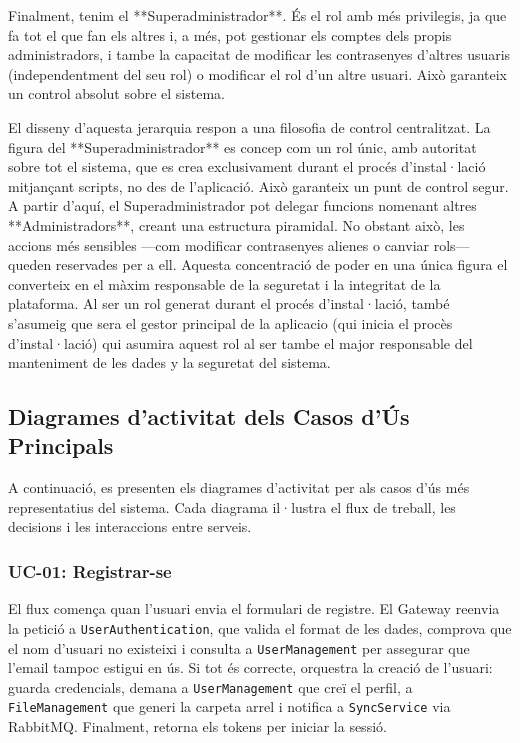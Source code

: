 Finalment, tenim el **Superadministrador**. És el rol amb més privilegis, ja que fa tot el que fan els altres i, a més, pot gestionar els comptes dels propis administradors, i tambe la capacitat de modificar les contrasenyes d'altres usuaris (independentment del seu rol) o modificar el rol d'un altre usuari. Això garanteix un control absolut sobre el sistema.

El disseny d'aquesta jerarquia respon a una filosofia de control centralitzat. La figura del **Superadministrador** es concep com un rol únic, amb autoritat sobre tot el sistema, que es crea exclusivament durant el procés d'instal·lació mitjançant scripts, no des de l'aplicació. Això garanteix un punt de control segur. A partir d'aquí, el Superadministrador pot delegar funcions nomenant altres **Administradors**, creant una estructura piramidal. No obstant això, les accions més sensibles —com modificar contrasenyes alienes o canviar rols— queden reservades per a ell. Aquesta concentració de poder en una única figura el converteix en el màxim responsable de la seguretat i la integritat de la plataforma. Al ser un rol generat durant el procés d'instal·lació, també s'asumeig que sera el gestor principal de la aplicacio (qui inicia el procès d'instal·lació) qui asumira aquest rol al ser tambe el major responsable del manteniment de les dades y la seguretat del sistema.

\subsection{Diagrames d'activitat dels Casos d'Ús Principals}
A continuació, es presenten els diagrames d'activitat per als casos d'ús més representatius del sistema. Cada diagrama il·lustra el flux de treball, les decisions i les interaccions entre serveis.

\subsubsection{UC-01: Registrar-se}
El flux comença quan l'usuari envia el formulari de registre. El Gateway reenvia la petició a \texttt{UserAuthentication}, que valida el format de les dades, comprova que el nom d'usuari no existeixi i consulta a \texttt{UserManagement} per assegurar que l'email tampoc estigui en ús. Si tot és correcte, orquestra la creació de l'usuari: guarda credencials, demana a \texttt{UserManagement} que creï el perfil, a \texttt{FileManagement} que generi la carpeta arrel i notifica a \texttt{SyncService} via RabbitMQ. Finalment, retorna els tokens per iniciar la sessió.

